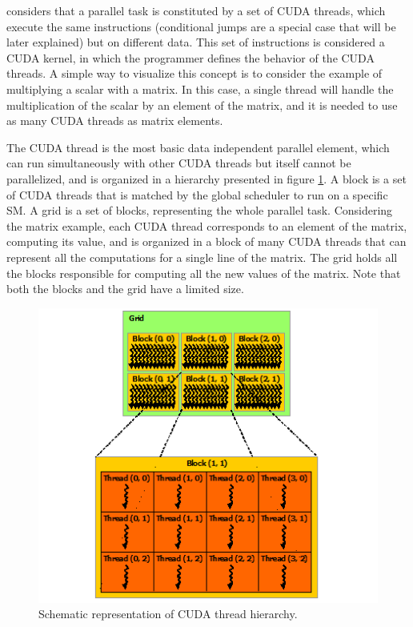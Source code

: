 \nvidia considers that a parallel task is constituted by a set of CUDA threads, which execute the same instructions (conditional jumps are a special case that will be later explained) but on different data. This set of instructions is considered a CUDA kernel, in which the programmer defines the behavior of the CUDA threads. A simple way to visualize this concept is to consider the example of multiplying a scalar with a matrix. In this case, a single thread will handle the multiplication of the scalar by an element of the matrix, and it is needed to use as many CUDA threads as matrix elements.

The CUDA thread is the most basic data independent parallel element, which can run simultaneously with other CUDA threads but itself cannot be parallelized, and is organized in a hierarchy presented in figure \ref{fig:CUDAHierarchy}. A block is a set of CUDA threads that is matched by the global scheduler to run on a specific SM. A grid is a set of blocks, representing the whole parallel task. Considering the matrix example, each CUDA thread corresponds to an element of the matrix, computing its value, and is organized in a block of many CUDA threads that can represent all the computations for a single line of the matrix. The grid holds all the blocks responsible for computing all the new values of the matrix. Note that both the blocks and the grid have a limited size.

\begin{figure}[!htp]
	\begin{center}
		\includegraphics[scale=0.8]{../../common/img/cuda_hierarchy.png}
		\caption{Schematic representation of CUDA thread hierarchy.}
		\label{fig:CUDAHierarchy}
	\end{center}
\end{figure}

